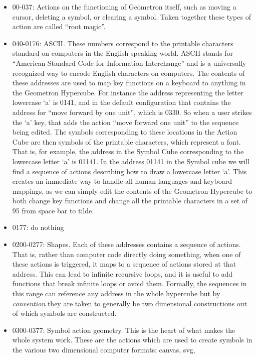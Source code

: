\documentclass[12pt,a4paper]{amsart}
\numberwithin{equation}{section}
\begin{document}
\begin{itemize}
\item
  00-037: Actions on the functioning of Geometron itself, such as moving
  a cursor, deleting a symbol, or clearing a symbol. Taken together
  these types of action are called ``root magic''.
\item
  040-0176: ASCII. These numbers correspond to the printable characters
  standard on computers in the English speaking world. ASCII stands for
  ``American Standard Code for Information Interchange'' and is a
  universally recognized way to encode English characters on computers.
  The contents of these addresses are used to map key functions on a
  keyboard to anything in the Geometron Hypercube. For instance the
  address representing the letter lowercase `a' is 0141, and in the
  default configuration that contains the address for ``move forward by
  one unit'', which is 0330. So when a user strikes the `a' key, that
  adds the action ``move forward one unit'' to the sequence being
  edited. The symbols corresponding to these locations in the Action
  Cube are then symbols of the printable characters, which represent a
  font. That is, for example, the address in the Symbol Cube
  corresponding to the lowercase letter `a' is 01141. In the address
  01141 in the Symbol cube we will find a sequence of actions describing
  how to draw a lowercase letter `a'. This creates an immediate way to
  handle all human languages and keyboard mappings, as we can simply
  edit the contents of the Geometron Hypercube to both change key
  functions and change all the printable characters in a set of 95 from
  space bar to tilde.
\item
  0177: do nothing
\item
  0200-0277: Shapes. Each of these addresses contains a sequence of
  actions. That is, rather than computer code directly doing something,
  when one of these actions is triggered, it maps to a sequence of
  actions stored at that address. This can lead to infinite recursive
  loops, and it is useful to add functions that break infinite loops or
  avoid them. Formally, the sequences in this range can reference any
  address in the whole hypercube but by \emph{convention} they are taken
  to generally be two dimensional constructions out of which symbols are
  constructed.\\
\item
  0300-0377: Symbol action geometry. This is the heart of what makes the
  whole system work. These are the actions which are used to create
  symbols in the various two dimensional computer formats: canvas, svg,

\end{itemize}
\end{document}

